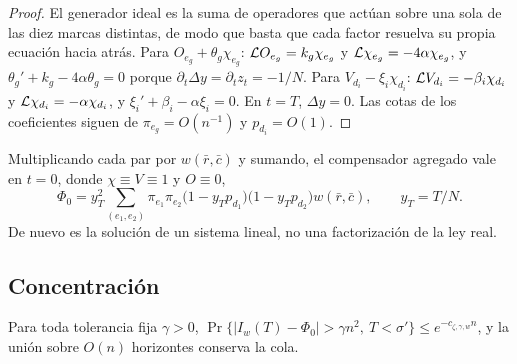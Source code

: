 \begin{proof}
El generador ideal es la suma de operadores que actúan sobre una sola de las diez marcas
distintas, de modo que basta que cada factor resuelva su propia ecuación hacia atrás. Para
$O_{e_g}+\theta_g\chi_{e_g}$: $\mathcal{L} O_{e_g}=k_g\chi_{e_g}$ y $\mathcal{L}\chi_{e_g}=-4\alpha\chi_{e_g}$, y
$\theta_g'+k_g-4\alpha\theta_g=0$ porque $\partial_t\Delta y=\partial_tz_t=-1/N$. Para
$V_{d_i}-\xi_i\chi_{d_i}$: $\mathcal{L} V_{d_i}=-\beta_i\chi_{d_i}$ y $\mathcal{L}\chi_{d_i}=-\alpha\chi_{d_i}$, y
$\xi_i'+\beta_i-\alpha\xi_i=0$. En $t=T$, $\Delta y=0$. Las cotas de los coeficientes siguen de
$\pi_{e_g}=O(n^{-1})$ y $p_{d_i}=O(1)$.
\end{proof}

Multiplicando cada par por $w(\bar r,\bar c)$ y sumando, el compensador agregado vale en $t=0$,
donde $\chi\equiv V\equiv1$ y $O\equiv0$,
\[
 \Phi_0=y_T^2\sum_{(e_1,e_2)}\pi_{e_1}\pi_{e_2}\bigl(1-y_Tp_{d_1}\bigr)\bigl(1-y_Tp_{d_2}\bigr)
 w(\bar r,\bar c),\qquad y_T=T/N .
\]
De nuevo es la solución de un sistema lineal, no una factorización de la ley real.

\subsection{Concentración}

\begin{lema}\label{lem:conc_inversa}
Para toda tolerancia fija $\gamma>0$,
$\Pr\{|I_w(T)-\Phi_0|>\gamma n^2,\ T<\sigma'\}\le e^{-c_{\zeta,\gamma,w}n}$, y la unión sobre
$O(n)$ horizontes conserva la cola.
\end{lema}

